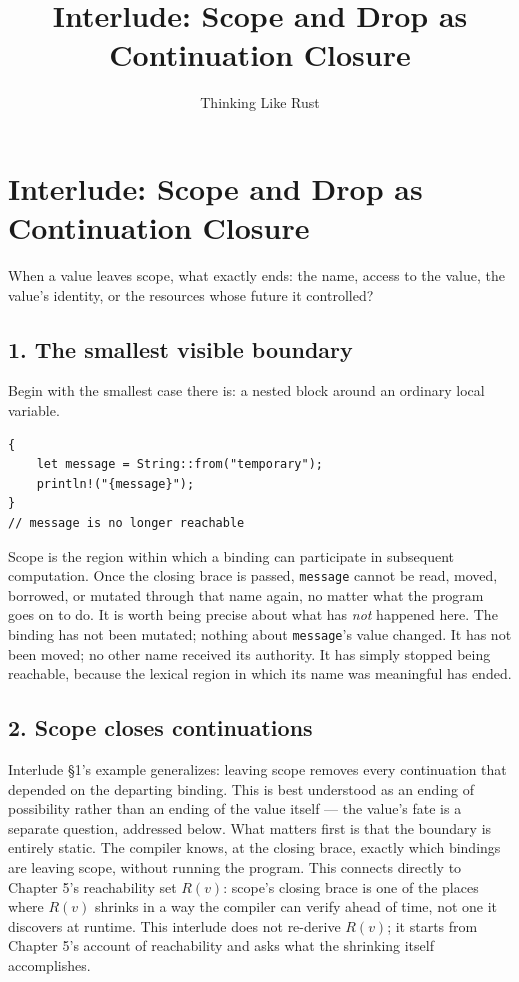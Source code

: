 \documentclass[11pt]{book}
\title{Interlude: Scope and Drop as Continuation Closure}
\author{Thinking Like Rust}
\date{}
\begin{document}
\chapter*{Interlude: Scope and Drop as Continuation Closure}

\begin{firstprinciples}
When a value leaves scope, what exactly ends: the name, access to the value, the value's identity, or the resources whose future it controlled?
\end{firstprinciples}

\section*{1. The smallest visible boundary}

Begin with the smallest case there is: a nested block around an ordinary local variable.

\begin{lstlisting}
{
    let message = String::from("temporary");
    println!("{message}");
}
// message is no longer reachable
\end{lstlisting}

Scope is the region within which a binding can participate in subsequent computation. Once the closing brace is passed, \texttt{message} cannot be read, moved, borrowed, or mutated through that name again, no matter what the program goes on to do. It is worth being precise about what has \emph{not} happened here. The binding has not been mutated; nothing about \texttt{message}'s value changed. It has not been moved; no other name received its authority. It has simply stopped being reachable, because the lexical region in which its name was meaningful has ended.

\section*{2. Scope closes continuations}

Interlude \S1's example generalizes: leaving scope removes every continuation that depended on the departing binding. This is best understood as an ending of possibility rather than an ending of the value itself --- the value's fate is a separate question, addressed below. What matters first is that the boundary is entirely static. The compiler knows, at the closing brace, exactly which bindings are leaving scope, without running the program. This connects directly to Chapter 5's reachability set $R(v)$: scope's closing brace is one of the places where $R(v)$ shrinks in a way the compiler can verify ahead of time, not one it discovers at runtime. This interlude does not re-derive $R(v)$; it starts from Chapter 5's account of reachability and asks what the shrinking itself accomplishes.
\end{document}
